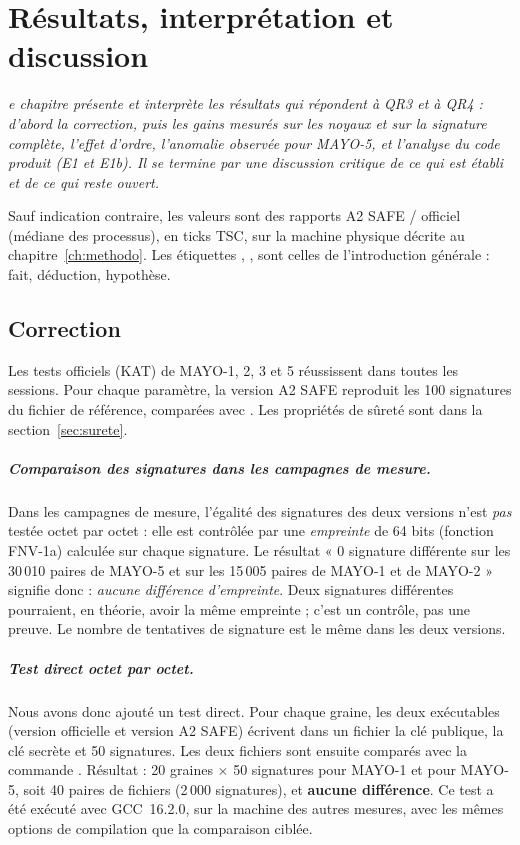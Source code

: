 \let\textcircled=\pgftextcircled
\chapter[Résultats et discussion]{Résultats, interprétation et discussion}
\label{ch:resultats}

\bigskip

\textit{e chapitre présente et interprète les résultats qui répondent à QR3 et à QR4 : d'abord la correction, puis les gains mesurés sur les noyaux et sur la signature complète, l'effet d'ordre, l'anomalie observée pour MAYO-5, et l'analyse du code produit (E1 et E1b). Il se termine par une discussion critique de ce qui est établi et de ce qui reste ouvert.}

\newpage


Sauf indication contraire, les valeurs sont des rapports A2 SAFE / officiel (médiane des processus), en ticks TSC, sur la machine physique décrite au chapitre~\ref{ch:methodo}. Les étiquettes \F{}, \I{}, \Hy{} sont celles de l'introduction générale : \F{} fait, \I{} déduction, \Hy{} hypothèse.

\section{Correction}\label{sec:correction}
\F{} Les tests officiels (KAT) de MAYO-1, 2, 3 et 5 réussissent dans toutes les sessions. Pour chaque paramètre, la version A2 SAFE reproduit les 100 signatures du fichier de référence, comparées avec . Les propriétés de sûreté sont dans la section~\ref{sec:surete}.

\paragraph{Comparaison des signatures dans les campagnes de mesure.} Dans les campagnes de mesure, l'égalité des signatures des deux versions n'est \emph{pas} testée octet par octet : elle est contrôlée par une \emph{empreinte} de 64 bits (fonction FNV-1a) calculée sur chaque signature. Le résultat « 0 signature différente sur les 30\,010 paires de MAYO-5 et sur les 15\,005 paires de MAYO-1 et de MAYO-2 » signifie donc : \emph{aucune différence d'empreinte}. Deux signatures différentes pourraient, en théorie, avoir la même empreinte ; c'est un contrôle, pas une preuve. Le nombre de tentatives de signature est le même dans les deux versions.

\paragraph{Test direct octet par octet.} Nous avons donc ajouté un test direct. Pour chaque graine, les deux exécutables (version officielle et version A2 SAFE) écrivent dans un fichier la clé publique, la clé secrète et 50 signatures. Les deux fichiers sont ensuite comparés avec la commande . Résultat : 20 graines $\times$ 50 signatures pour MAYO-1 et pour MAYO-5, soit 40 paires de fichiers (2\,000 signatures), et \textbf{aucune différence}. Ce test a été exécuté avec GCC~16.2.0, sur la machine des autres mesures, avec les mêmes options de compilation que la comparaison ciblée.

